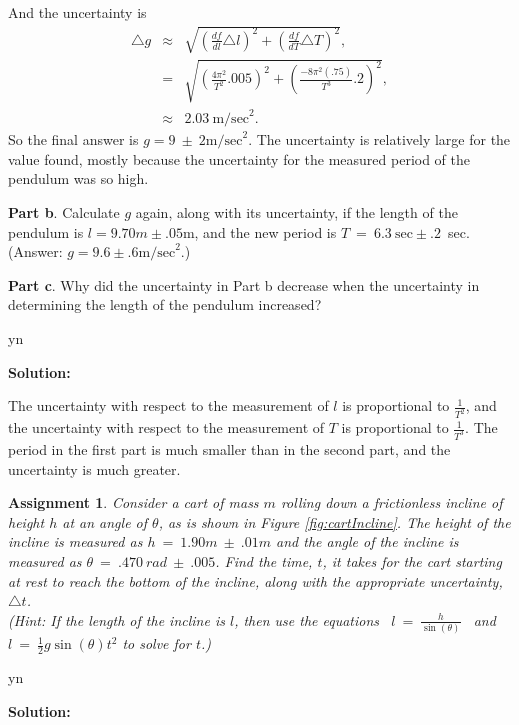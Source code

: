 \documentclass[12pt]{article}
\def\solutions{y}
\def\solutions{n}
\newtheorem{assignment}{Assignment}[section]
\begin{document}
And the uncertainty is
\begin{eqnarray*}
\triangle{g} & \approx & \sqrt{
  \left(\frac{df}{dl}\triangle{l}\right)^2 + 
  \left(\frac{df}{dT}\triangle{T}\right)^2}, \\
& = & \sqrt{
  \left(\frac{4\pi^2}{T^2}.005\right)^2 + 
  \left(\frac{-8\pi^2(.75)}{T^3}.2\right)^2}, \\
& \approx & 2.03 ~ \mathrm{m/sec}^2.
\end{eqnarray*}
So the final answer is $g=9~\pm~2 \mathrm{m/sec}^2$. The uncertainty is
relatively large for the value found, mostly because the uncertainty
for the measured period of the pendulum was so high.  

\fi

\textbf{Part b}.  Calculate $g$ again, along with its uncertainty, if
the length of the pendulum is $l=9.70m\pm .05$m, and the new period
is $T~=~6.3~\mathrm{sec}\pm .2$~sec. (Answer: $g=9.6\pm .6\mathrm{m/sec}^2$.)

\textbf{Part c}.  Why did the uncertainty in Part b decrease when the
uncertainty in determining the length of the pendulum increased?  

\if y\solutions

\textbf{Solution:}

The uncertainty with respect to the measurement of $l$ is proportional
to $\frac{1}{T^2}$, and the uncertainty with respect to the
measurement of $T$ is proportional to $\frac{1}{T^3}$.  The period in
the first part is much smaller than in the second part, and the
uncertainty is much greater.

\fi

\begin{assignment}
  Consider a cart of mass $m$ rolling down a frictionless incline of
  height $h$ at an angle of $\theta$, as is shown in Figure
  \ref{fig:cartIncline}.  The height of the incline is measured as
  $ h~=~1.90m~\pm~.01m$ and the angle of the incline is measured as
  $\theta~=~.470~rad ~\pm~.005 $.  Find the time, $t$, it takes for the cart
  starting at rest to reach the bottom of the
  incline, along with the appropriate uncertainty, $\triangle{t}$. \\
  (Hint: If the length of the incline is $l$, then use the equations
  ~$l~=~\frac{h}{\sin(\theta)}$ ~and~~$l~=~\frac{1}{2}g\sin(\theta) t^2$ to
  solve for $t$.)
\end{assignment}

\if y\solutions

\textbf{Solution:}
\end{document}
